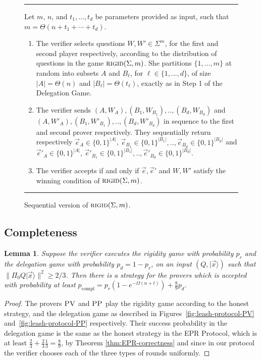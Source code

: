 \documentclass[11pt,letter]{article}
\newtheorem{lemma}[theorem]{Lemma}
\theoremstyle{remark}
\theoremstyle{definition}
\newcommand{\ket}[1]{|#1\rangle}
\newcommand{\rigid}{\textsc{rigid}}
\newcommand{\pv}{\textsc{PV}}
\newcommand{\pp}{\textsc{PP}}
\begin{document}
\begin{figure}[H]
\rule[1ex]{16.5cm}{0.5pt}
\vspace{-25pt}
\justify 
Let $m$, $n$, and $t_1,\ldots,t_d$ be parameters provided as input, such that $m = \Theta(n+t_1+\cdots+t_d)$. 
\begin{enumerate}
\item The verifier selects questions $W,W' \in \Sigma^{m}$, for the first and second player respectively, according to the distribution of questions in the game $\rigid(\Sigma,m)$. She partitions $\{1,\ldots,m\}$ at random into subsets $A$ and $B_\ell$, for $\ell\in\{1,\ldots,d\}$, of size $|A|=\Theta(n)$ and $|B_\ell|=\Theta(t_\ell)$, exactly as in Step 1 of the Delegation Game. 
\item The verifier sends $(A,W_A), (B_1,W_{B_1}),.., (B_d,W_{B_d})$ and $(A,W'_A), (B_1,W'_{B_1}), .., (B_d,W'_{B_d})$ in sequence to the first and second prover respectively. They sequentially return respectively $\vec{e}_A \in \{0,1\}^{|A|}$, $\vec{e}_{B_1} \in \{0,1\}^{|B_1|},.., \vec{e}_{B_d} \in \{0,1\}^{|B_d|}$ and $\vec{e}'_A \in \{0,1\}^{|A|}$, $\vec{e}'_{B_1} \in \{0,1\}^{|B_1|},.., \vec{e}'_{B_d} \in \{0,1\}^{|B_d|}$.
\item The verifier accepts if and only if $\vec{e},\vec{e}'$ and $W,W'$ satisfy the winning condition of $\rigid(\Sigma,m)$.
\end{enumerate}
\rule[2ex]{16.5cm}{0.5pt}\vspace{-.5cm}
\caption{Sequential version of $\rigid(\Sigma,m)$.}
\label{fig:consistency-game}
\end{figure} 




\subsection{Completeness}

\begin{lemma}\label{lem:leash-completeness}
Suppose the verifier executes the rigidity game with probability $p_r$ and the delegation game with probability $p_d=1-p_r$, on an input $(Q,\ket{\vec{x}})$ such that $\|\Pi_0 Q \ket{\vec{x}}\|^2 \geq 2/3$. Then there is a strategy for the provers which is accepted with probability at least $p_{\mathrm{compl}} = p_r(1-e^{-\Omega(n+t)}) + \frac{8}{9}p_d$. 
\end{lemma}

\begin{proof}
The provers $\pv$ and $\pp$ play the rigidity game according to the honest strategy, and the delegation game as described in Figures~\ref{fig:leash-protocol-PV} and~\ref{fig:leash-protocol-PP} respectively. Their success probability in the delegation game is the same as the honest strategy in the EPR Protocol, which is at least $\frac{2}{3}+\frac{2}{3}\frac{1}{3}=\frac{8}{9}$, by Theorem \ref{thm:EPR-correctness} and since in our protocol the verifier chooses each of the three types of rounds uniformly.
\end{proof}
\end{document}
